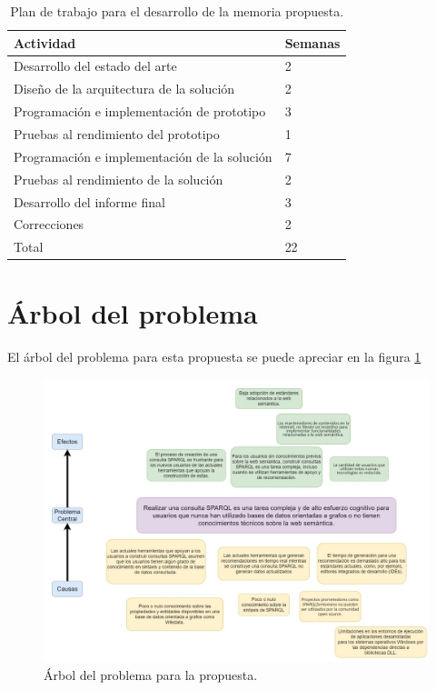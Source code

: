 \documentclass[conference,compsoc]{IEEEtran}
\begin{document}
\begin{table}[h]
    \label{tab:plan-trabajo}
    \centering
    \caption{Plan de trabajo para el desarrollo de la memoria propuesta.}
    \begin{tabular}{|l|l|}
        \hline
        Actividad                                    & Semanas \\ \hline
        Desarrollo del estado del arte               & 2       \\ \hline
        Diseño de la arquitectura de la solución     & 2       \\ \hline
        Programación e implementación de prototipo   & 3       \\ \hline
        Pruebas al rendimiento del prototipo         & 1       \\ \hline
        Programación e implementación de la solución & 7       \\ \hline
        Pruebas al rendimiento de la solución        & 2       \\ \hline
        Desarrollo del informe final                 & 3       \\ \hline
        Correcciones                                 & 2       \\ \hline
        Total                                        & 22      \\ \hline
    \end{tabular}
\end{table}





\newpage
\onecolumn
\appendices
{}


\section{Árbol del problema}

El árbol del problema para esta propuesta se puede apreciar en la figura \ref{fig:arbol-prob}

\begin{figure}[htbp]
    \label{fig:arbol-prob}
    \centering
    \includegraphics[width=\textwidth]{arbol}
    \caption{Árbol del problema para la propuesta.}
\end{figure}
\end{document}
